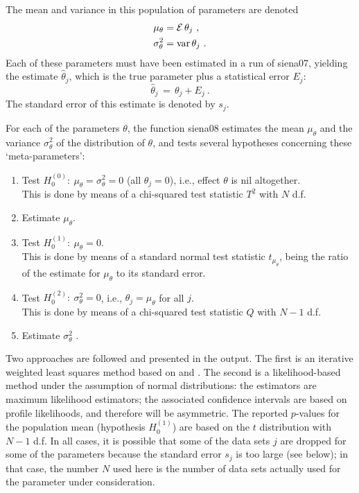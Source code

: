 \documentclass[a4paper,fleqn,11pt]{article}
\newcommand{\var}{\mbox{var}}
\newcommand{\+}{\, + \,}
\newcommand{\E}{\mbox{$\cal E$}}
\begin{document}
The mean and variance in this population of parameters are denoted
\begin{align*}
 \mu_\theta &= \E\, \theta_j \ , \\
 \sigma^2_\theta &= \var\, \theta_j \ .
\end{align*}
Each of these parameters must have been estimated in a run of
\textsf{siena07}, yielding the estimate $\hat\theta_j$,
which is the true parameter plus a statistical error $E_j$:
\[
\hat\theta_j \,=\, \theta_j + E_j \ .
\]
The standard error of this estimate is denoted by $s_j$.

For each of the parameters $\theta$, the function \textsf{siena08}
estimates the mean $\mu_\theta$
and the variance $\sigma^2_\theta$ of the distribution of $\theta$,
and tests several hypotheses concerning these `meta-parameters':
\begin{enumerate}
\item Test $H_0^{(0)}:\ \mu_\theta = \sigma^2_\theta = 0$
                       (all $\theta_j = 0$),
                      i.e., effect $\theta$ is nil altogether.\\
      This is done by means of a chi-squared test statistic $T^2$
      with $N$ d.f.
\item Estimate  $\mu_\theta $.
\item Test $H_0^{(1)}:\ \mu_\theta = 0$.\\
      This is done by means of a standard normal test statistic
      $ t_{\mu_\theta}$,
      being the ratio of the estimate for $\mu_\theta $
      to its standard error.
\item Test $H_0^{(2)}:\ \sigma^2_\theta = 0$,
                     i.e., $\theta_j = \mu_\theta$ for all $j$. \\
      This is done by means of a chi-squared test statistic $Q$
      with $N-1$ d.f.
\item Estimate  $\sigma^2_\theta$ .
\end{enumerate}
Two approaches are followed and presented in the output.
The first is an iterative weighted least squares method based on
\citet{Cochran54} and \citet{SnijdersBaerveldt03}.
The second is a likelihood-based method under the assumption
of normal distributions: the estimators are maximum likelihood
estimators; the associated confidence intervals
are based on profile likelihoods, and therefore will be
asymmetric. The reported
$p$-values for the population mean (hypothesis $H_0^{(1)}$)
are based on the $t$ distribution with $N-1$ d.f.
In all cases, it is possible that some of the data sets $j$ are
dropped for some of the parameters because the standard error $s_j$
is too large (see below);
in that case, the number $N$ used here
is the number of data sets actually used for the
parameter under consideration.
\end{document}
